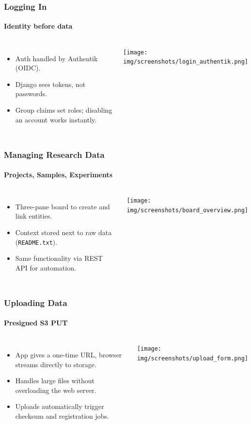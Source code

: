 \documentclass{beamer}
\begin{document}
	\begin{frame}
		\frametitle{Logging In}
		\framesubtitle{Identity before data}
		\begin{columns}[T,totalwidth=\textwidth]
			\begin{itemize}
				\item Auth handled by Authentik (OIDC).
				\item Django sees tokens, not passwords.
				\item Group claims set roles; disabling an account works instantly.
			\end{itemize}
			\texttt{[image: img/screenshots/login\_authentik.png]}
		\end{columns}
	\end{frame}
	
	\begin{frame}
		\frametitle{Managing Research Data}
		\framesubtitle{Projects, Samples, Experiments}
		\begin{columns}[T,totalwidth=\textwidth]
			\column{0.52\textwidth}
			\begin{itemize}
				\item Three-pane board to create and link entities.
				\item Context stored next to raw data (\texttt{README.txt}).
				\item Same functionality via REST API for automation.
			\end{itemize}
			\column{0.48\textwidth}
			\texttt{[image: img/screenshots/board\_overview.png]}
		\end{columns}
	\end{frame}
	
	\begin{frame}
		\frametitle{Uploading Data}
		\framesubtitle{Presigned S3 PUT}
		\begin{columns}[T,totalwidth=\textwidth]
			\column{0.55\textwidth}
			\begin{itemize}
				\item App gives a one-time URL, browser streams directly to storage.
				\item Handles large files without overloading the web server.
				\item Uploads automatically trigger checksum and registration jobs.
			\end{itemize}
			\column{0.45\textwidth}
			\texttt{[image: img/screenshots/upload\_form.png]}
		\end{columns}
	\end{frame}
	
\end{document}
